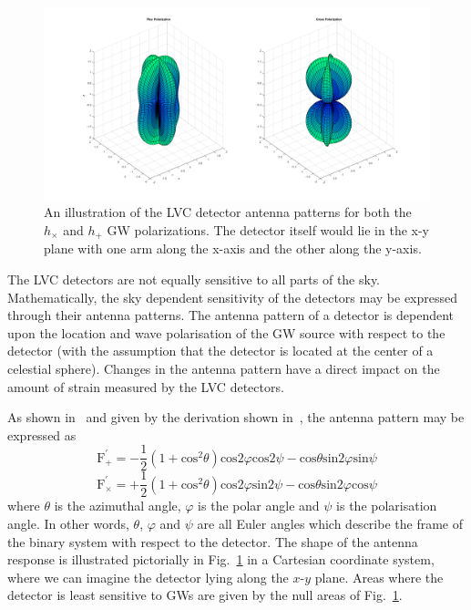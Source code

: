 \begin{figure}
    \centering
    \includegraphics[width=\linewidth]{figures/peanut.png}
    \caption[Illustration of the \ac{LVC} detector antenna patterns for both the $h_\times$ and $h_+$ \ac{GW} polarizations]{An illustration of the \ac{LVC} detector antenna patterns for both the $h_\times$ and $h_+$ \ac{GW} polarizations. The detector itself would lie in the x-y plane with one arm along the x-axis and the other along the y-axis.}
    \label{fig:gw_plus_cross}
\end{figure}

The \ac{LVC} detectors are not equally sensitive to all parts of 
the sky. Mathematically, the sky dependent sensitivity of the detectors 
may be expressed through their antenna patterns. 
The antenna pattern of a detector is dependent upon the location and 
wave polarisation 
of the \ac{GW} source with respect to the detector (with the assumption that the detector is located at the center of a celestial sphere). Changes in the 
antenna pattern have a direct impact on the 
amount of strain measured by the \ac{LVC} detectors. 

As shown in~\cite{PhysRevD.63.042003} and given by 
the derivation shown in~\cite{Capano2011SearchingFG}, the antenna 
pattern may be expressed as
%
\begin{equation}
    \mathrm{F}_{+}^{'} = -\frac{1}{2}(1+\mathrm{cos}^2 \theta) \mathrm{cos}2\varphi \mathrm{cos}2\psi - \mathrm{cos}\theta\mathrm{sin}2\varphi\mathrm{sin}\psi
\end{equation}
%
\begin{equation}
    \mathrm{F}_{\times}^{'} = +\frac{1}{2}(1+\mathrm{cos}^2 \theta) \mathrm{cos}2\varphi \mathrm{sin}2\psi - \mathrm{cos}\theta\mathrm{sin}2\varphi\mathrm{cos}\psi
\end{equation}
%
where $\theta$ is the azimuthal angle, $\varphi$ is the polar angle and $\psi$ 
is the polarisation angle. In other words, $\theta$, $\varphi$ and $\psi$ are all Euler angles which describe the frame of the binary system with 
respect to the detector. The shape of the antenna response is illustrated pictorially in Fig.~\ref{fig:gw_plus_cross} in a Cartesian coordinate system, 
where we can imagine the detector lying along the $x$-$y$ plane. Areas 
where the detector is least sensitive to \ac{GW}s are given by 
the null areas of Fig.~\ref{fig:gw_plus_cross}. 

